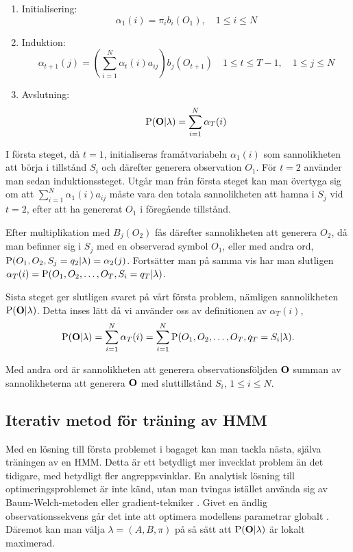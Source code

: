\documentclass[../rapport_MVEX01-11-05]{subfiles}
\begin{document}
\begin{enumerate}
\item Initialisering:
\begin{equation*}
\alpha_1(i) = \pi_ib_i(O_1), \quad 1\leq i \leq N
\end{equation*}

\item Induktion:
\begin{equation*}
\alpha_{t+1}(j) =
\left(\sum_{i=1}^N\alpha_t(i)a_{ij}\right)b_j(O_{t+1}) \quad 1 \leq t \leq T-1,\quad1 \leq j \leq N
\end{equation*}

\item Avslutning:
\begin{equation*}
\mathrm{P}(\mathbf{O}|\lambda) = \sum_{i=1}^N\alpha_T(i)
\end{equation*}
\end{enumerate}

I första steget, då $t=1$, initialiseras framåtvariabeln $\alpha_1(i)$ som
sannolikheten att börja i tillstånd $S_i$ och därefter generera
observation $O_1$. För $t=2$ använder man sedan induktionssteget. Utgår man
från första steget kan man övertyga sig om att
$\sum_{i=1}^N\alpha_1(i)a_{ij}$ måste vara den totala sannolikheten
att hamna i $S_j$ vid $t=2$, efter att ha genererat $O_1$ i föregående
tillstånd.

Efter multiplikation med $B_j(O_{2})$ fås därefter
sannolikheten att generera $O_2$, då man befinner sig i $S_j$ med en
observerad symbol $O_1$, eller med andra ord, $\mathrm{P}(O_1,O_2,S_j
= q_2 | \lambda) = \alpha_2(j)$. Fortsätter man på samma vis har man
slutligen $\alpha_T(i) = \mathrm{P}(O_1,O_2,\dots,O_T,S_i = q_T |
\lambda)$.

Sista steget ger slutligen svaret på vårt första problem, nämligen
sannolikheten $\mathrm{P}(\mathbf{O}|\lambda)$. Detta inses lätt då vi
använder oss av definitionen av $\alpha_T(i)$, 
\begin{equation*}
\mathrm{P}(\mathbf{O}|\lambda) = \sum_{i=1}^N\alpha_T(i) =
\sum_{i=1}^N\mathrm{P}(O_1,O_2,\dots,O_T,q_T = S_i|\lambda). 
\end{equation*} 

Med andra ord är sannolikheten att generera observationsföljden
$\mathbf{O}$ summan av sannolikheterna att generera $\mathbf{O}$ med
sluttillstånd $S_i$, $1 \leq i \leq N$.

\subsection{Iterativ metod för träning av HMM}
Med en lösning till första problemet i bagaget kan man tackla nästa,
själva träningen av en HMM. Detta är ett betydligt mer invecklat
problem än det tidigare, med betydligt fler angreppsvinklar. En
analytisk lösning till optimeringsproblemet är inte känd, utan man
tvingas istället använda sig av Baum-Welch-metoden eller
gradient-tekniker \cite{Dempster77,Levinson83}. 
Givet en ändlig observationssekvens går det inte att optimera modellens parametrar globalt \cite{Rabiner89}.
Däremot kan man välja $\lambda = (A,B,\pi)$ på så sätt att $\mathrm{P}(\mathbf{O}|\lambda)$ är lokalt
maximerad. 
\end{document}
